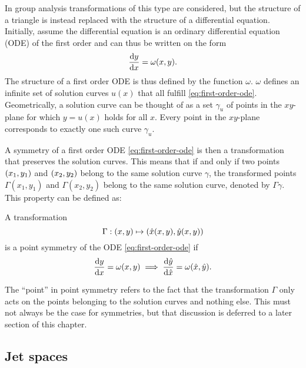 In group analysis transformations of this type are considered, but the structure of a triangle is instead replaced with the structure of a differential equation.
Initially, assume the differential equation is an ordinary differential equation (ODE) of the first order and can thus be written on the form
\begin{equation} \label{eq:first-order-ode}
  \dv{y}{x} = \omega(x,y).
\end{equation}
The structure of a first order ODE is thus defined by the function \(\omega\).
\(\omega\) defines an infinite set of solution curves \(u(x)\) that all fulfill \cref{eq:first-order-ode}.
Geometrically, a solution curve can be thought of as a set \(\gamma_u\) of points in the \(xy\)-plane for which \(y = u(x)\) holds for all \(x\).
Every point in the \(xy\)-plane corresponds to exactly one such curve \(\gamma_u\).

A symmetry of a first order ODE \ref{eq:first-order-ode} is then a transformation that preserves the solution curves.
This means that if and only if two points \(\pqty{x_1,y_1}\) and \(\pqty{x_2,y_2}\) belong to the same solution curve \(\gamma\), the transformed points \(\Gamma(x_1,y_1)\) and \(\Gamma(x_2,y_2)\) belong to the same solution curve, denoted by \(\Gamma\gamma\).
This property can be defined as:
\begin{defn} \label{defn:first-order-symmetry}
  A transformation 
  \begin{equation}
    \Gamma: \pqty{x,y} \mapsto \pqty{\hat{x}(x,y), \hat{y}(x,y)}
  \end{equation}
  is a point symmetry of the ODE \ref{eq:first-order-ode} if
  \begin{equation}
    \dv{y}{x} = \omega(x,y)
    \implies
    \dv{\hat{y}}{\hat{x}} = \omega(\hat{x},\hat{y}).
  \end{equation}
\end{defn}
The \enquote{point} in point symmetry refers to the fact that the transformation \(\Gamma\) only acts on the points belonging to the solution curves and nothing else.
This must not always be the case for symmetries, but that discussion is deferred to a later section of this chapter. %

\subsection{Jet spaces}

